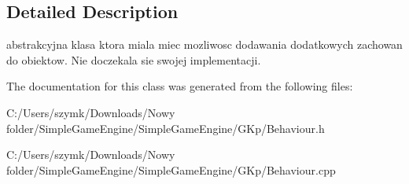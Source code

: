 \subsection{Detailed Description}
abstrakcyjna klasa ktora miala miec mozliwosc dodawania dodatkowych zachowan do obiektow. Nie doczekala sie swojej implementacji. 



The documentation for this class was generated from the following files\+:\begin{DoxyCompactItemize}
\item 
C\+:/\+Users/szymk/\+Downloads/\+Nowy folder/\+Simple\+Game\+Engine/\+Simple\+Game\+Engine/\+G\+Kp/Behaviour.\+h\item 
C\+:/\+Users/szymk/\+Downloads/\+Nowy folder/\+Simple\+Game\+Engine/\+Simple\+Game\+Engine/\+G\+Kp/Behaviour.\+cpp\end{DoxyCompactItemize}
